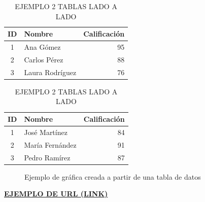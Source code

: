 \documentclass[letterpaper,10pt]{article}
\begin{document}
\begin{table}[H]
    \centering
    \begin{minipage}{0.45\textwidth}
        \centering
        \begin{tabular}{|c|l|r|}
            \hline
            \textbf{ID} & \textbf{Nombre} & \textbf{Calificación} \\ \hline
            1 & Ana Gómez & 95 \\ \hline
            2 & Carlos Pérez & 88 \\ \hline
            3 & Laura Rodríguez & 76 \\ \hline
        \end{tabular}
        \caption{Estudiantes del Grupo A}
        \label{tab:grupoA}
    \end{minipage}%
    \hfill
    \begin{minipage}{0.45\textwidth}
        \centering
        \begin{tabular}{|c|l|r|}
            \hline
            \textbf{ID} & \textbf{Nombre} & \textbf{Calificación} \\ \hline
            1 & José Martínez & 84 \\ \hline
            2 & María Fernández & 91 \\ \hline
            3 & Pedro Ramírez & 87 \\ \hline
        \end{tabular}
        \caption{Estudiantes del Grupo B}
        \label{tab:grupoB}
    \end{minipage}
    \caption{EJEMPLO 2 TABLAS LADO A LADO}
\end{table}
\begin{figure}[h]
    \centering
    \caption{Ejemplo de gráfica creada a partir de una tabla de datos}
    \label{fig:tabla_grafica}
\end{figure}
\textbf{\large{\href{https://youtu.be/dQw4w9WgXcQ?si=jGf-LdN459y-xefY}{EJEMPLO DE URL (LINK)}}}
\end{document}
